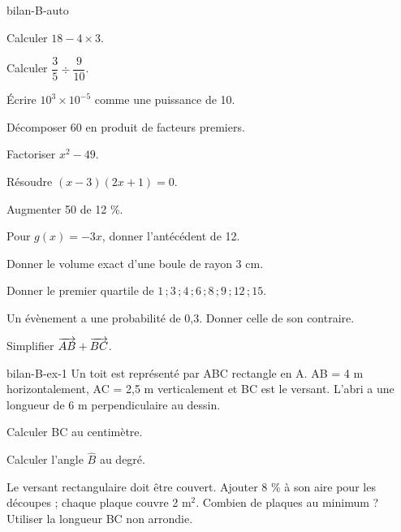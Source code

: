 \begin{blocEdition}{bilan-B-auto}
\begin{questions}
\item Calculer $18-4\times3$.
\item Calculer $\dfrac35\div\dfrac9{10}$.
\item Écrire $10^3\times10^{-5}$ comme une puissance de 10.
\item Décomposer 60 en produit de facteurs premiers.
\item Factoriser $x^2-49$.
\item Résoudre $(x-3)(2x+1)=0$.
\item Augmenter 50 de 12 \%.
\item Pour $g(x)=-3x$, donner l’antécédent de 12.
\item Donner le volume exact d’une boule de rayon 3 cm.
\item Donner le premier quartile de $1\,;3\,;4\,;6\,;8\,;9\,;12\,;15$.
\item Un évènement a une probabilité de 0,3. Donner celle de son contraire.
\item Simplifier $\overrightarrow{AB}+\overrightarrow{BC}$.\end{questions}
\end{blocEdition}
\begin{blocEdition}{bilan-B-ex-1}
Un toit est représenté par ABC rectangle en A. AB = 4 m horizontalement, AC = 2,5 m verticalement et BC est le versant. L’abri a une longueur de 6 m perpendiculaire au dessin.\begin{questions}
\item Calculer BC au centimètre.
\item Calculer l’angle $\widehat B$ au degré.
\item Le versant rectangulaire doit être couvert. Ajouter 8 \% à son aire pour les découpes ; chaque plaque couvre 2 m$^2$. Combien de plaques au minimum ? Utiliser la longueur BC non arrondie.
\end{questions}\par{}\label{fig-bilan-B-ex-1}

\end{blocEdition}
